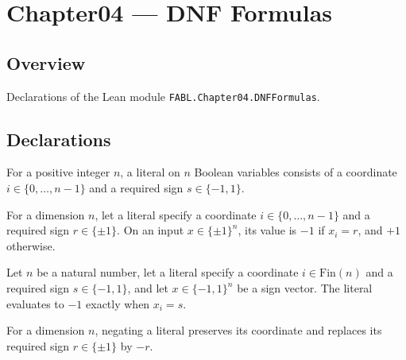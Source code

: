 \chapter{Chapter04 — DNF Formulas}
\section{Overview}

Declarations of the Lean module \texttt{FABL.Chapter04.DNFFormulas}.

\section{Declarations}

\begin{definition}
\label{FABL.Literal}
\leanok
{}
For a positive integer $n$, a literal on $n$ Boolean variables consists of a coordinate
$i\in\{0,\ldots,n-1\}$ and a required sign $s\in\{-1,1\}$.
\end{definition}

\begin{definition}
\label{FABL.Literal.eval}
\leanok
{}
For a dimension $n$, let a literal specify a coordinate $i\in\{0,\ldots,n-1\}$ and a
required sign $r\in\{\pm1\}$. On an input $x\in\{\pm1\}^n$, its value is $-1$ if
$x_i=r$, and $+1$ otherwise.
\end{definition}

\begin{theorem}
\label{FABL.Literal.eval_eq_neg_one_iff}
\leanok
{}
Let $n$ be a natural number, let a literal specify a coordinate $i\in\mathrm{Fin}(n)$
and a required sign $s\in\{-1,1\}$, and let $x\in\{-1,1\}^{n}$ be a sign vector. The
literal evaluates to $-1$ exactly when $x_i=s$.
\end{theorem}

\begin{definition}
\label{FABL.Literal.negate}
\leanok
{}
For a dimension $n$, negating a literal preserves its coordinate and replaces its
required sign $r\in\{\pm1\}$ by $-r$.
\end{definition}

